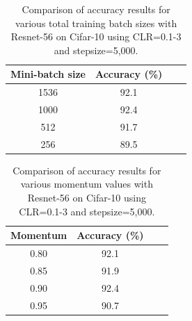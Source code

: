 \documentclass{article}
\begin{document}
	
	\begin{table}[tb]
		\begin{center}
			\begin{tabular}{| c | c | c | c |}
				\hline
				Mini-batch size &  Accuracy (\%) \\ \hline \hline
				1536  & 92.1 \\ \hline
				1000  & 92.4 \\ \hline
				512  & 91.7 \\ \hline
				256  & 89.5 \\ \hline
				
			\end{tabular}
			\vspace{5pt}
			\caption{Comparison of accuracy results for various total training batch sizes with Resnet-56 on Cifar-10 using CLR=0.1-3 and stepsize=5,000.}
			\label{tab1:results2}
		\end{center}
		\vspace{-5pt}
	\end{table}
	
	\begin{table}[tb]
		\begin{center}
			\begin{tabular}{| c | c | c | c |}
				\hline
				Momentum &  Accuracy (\%) \\ \hline \hline
				0.80  & 92.1 \\ \hline
				0.85  & 91.9 \\ \hline
				0.90  & 92.4 \\ \hline
				0.95  & 90.7 \\ \hline
				
			\end{tabular}
			\vspace{5pt}
			\caption{Comparison of accuracy results for various momentum values with Resnet-56 on Cifar-10 using CLR=0.1-3 and stepsize=5,000.}
			\label{tab1:results3}
		\end{center}
		\vspace{-5pt}
	\end{table}
	
	
\end{document}
